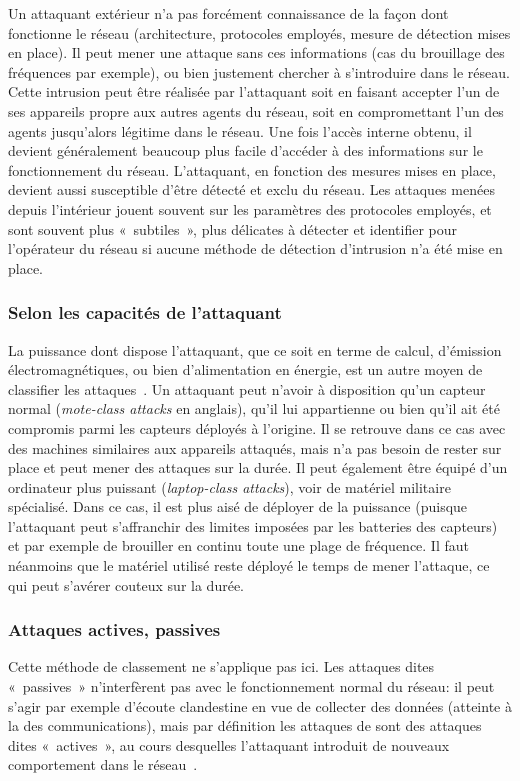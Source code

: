 Un attaquant extérieur n'a pas forcément connaissance de la façon dont fonctionne le réseau (architecture, protocoles employés, mesure de détection mises en place).
Il peut mener une attaque sans ces informations (cas du brouillage des fréquences par exemple), ou bien justement chercher à s'introduire dans le réseau.
Cette intrusion peut être réalisée par l'attaquant soit en faisant accepter l'un de ses appareils propre aux autres agents du réseau, soit en compromettant l'un des agents jusqu'alors légitime dans le réseau.
Une fois l'accès interne obtenu, il devient généralement beaucoup plus facile d'accéder à des informations sur le fonctionnement du réseau.
L'attaquant, en fonction des mesures mises en place, devient aussi susceptible d'être détecté et exclu du réseau.
Les attaques menées depuis l'intérieur jouent souvent sur les paramètres des protocoles employés, et sont souvent plus « subtiles », plus délicates à détecter et identifier pour l'opérateur du réseau si aucune méthode de détection d'intrusion n'a été mise en place.

    \subsubsection{Selon les capacités de l'attaquant}
La puissance dont dispose l'attaquant, que ce soit en terme de calcul, d'émission électromagnétiques, ou bien d'alimentation en énergie, est un autre moyen de classifier les attaques~\cite{AD14}.
Un attaquant peut n'avoir à disposition qu'un capteur normal (\textit{mote-class attacks} en anglais), qu'il lui appartienne ou bien qu'il ait été compromis parmi les capteurs déployés à l'origine.
Il se retrouve dans ce cas avec des machines similaires aux appareils attaqués, mais n'a pas besoin de rester sur place et peut mener des attaques sur la durée.
Il peut également être équipé d'un ordinateur plus puissant (\textit{laptop-class attacks}), voir de matériel militaire spécialisé.
Dans ce cas, il est plus aisé de déployer de la puissance (puisque l'attaquant peut s'affranchir des limites imposées par les batteries des capteurs) et par exemple de brouiller en continu toute une plage de fréquence.
Il faut néanmoins que le matériel utilisé reste déployé le temps de mener l'attaque, ce qui peut s'avérer couteux sur la durée.

    \subsubsection{Attaques actives, passives}
Cette méthode de classement ne s'applique pas ici.
Les attaques dites « passives » n'interfèrent pas avec le fonctionnement normal du réseau: il peut s'agir par exemple d'écoute clandestine en vue de collecter des données (atteinte à la  des communications), mais par définition les attaques de \dds sont des attaques dites « actives », au cours desquelles l'attaquant introduit de nouveaux comportement dans le réseau~\cite{SZFDXC14}.

